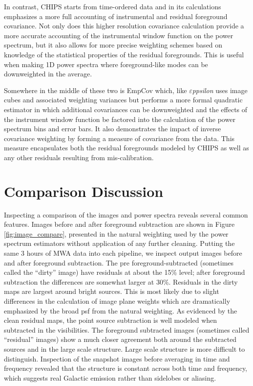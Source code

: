 \documentclass[twolcolumn,iop]{emulateapj}
\def\eppsilon{{\it $\varepsilon$ppsilon}}
\def\empirical{EmpCov}
\begin{document}
In contrast, CHIPS starts from time-ordered data and in its calculations emphasizes a more full accounting of instrumental and residual foreground covariance. Not only does this higher resolution covariance calculation provide a more accurate accounting of the instrumental window function on the power spectrum, but it also allows for more precise weighting schemes based on knowledge of the statistical properties of the residual foregrounds. This is useful when making 1D power spectra where foreground-like modes can be downweighted in the average. 

Somewhere in the middle of these two is \empirical{} which, like \eppsilon{} uses image cubes and associated weighting variances but performs a more formal quadratic estimator in which additional covariances can be downweighted and the effects of the instrument window function be factored into the calculation of the power spectrum bins and error bars.  It also demonstrates the impact of inverse covariance weighting by forming a measure of covariance from the data. This measure encapsulates both the residual foregrounds modeled by CHIPS as well as any other residuals resulting from mis-calibration.


\section{Comparison Discussion}
\label{sec:results}

Inspecting a comparison of the images and power spectra reveals several common features. Images before and after foreground subtraction are shown in Figure \ref{fig:image_compare}, presented in the natural weighting used by the power spectrum estimators without application of any further cleaning.  Putting the same 3 hours of MWA data into each pipeline, we inspect output images before and after foreground subtraction. The pre foreground-subtracted (sometimes called the ``dirty'' image) have residuals at about the 15\% level; after foreground subtraction the differences are somewhat larger at 30\%. Residuals in the dirty maps are largest  around bright sources. This is most likely due to slight differences in the calculation of image plane weights which are dramatically emphasized by the broad psf from the natural weighting. As evidenced by the clean residual maps, the point source subtraction is well modeled when subtracted in the visibilities.  The foreground subtracted images (sometimes called ``residual'' images) show a much closer agreement both around the subtracted sources and in the large scale structure. Large scale structure is more difficult to distinguish. Inspection of the snapshot images before averaging in time and frequency revealed that the structure is constant across both time and frequency, which suggests real Galactic emission rather than sidelobes or aliasing.  
\end{document}
